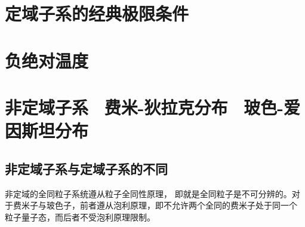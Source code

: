 \documentclass[12pt,a4paper]{article}
\begin{document}
\section{定域子系的经典极限条件}







































\section{负绝对温度}







































\section{非定域子系 ~费米-狄拉克分布 ~玻色-爱因斯坦分布}
\subsection{非定域子系与定域子系的不同}
非定域的全同粒子系统遵从粒子全同性原理， 即就是全同粒子是不可分辨的。对于费米子与玻色子，前者遵从泡利原理，即不允许两个全同的费米子处于同一个 粒子量子态，而后者不受泡利原理限制。
\end{document}
